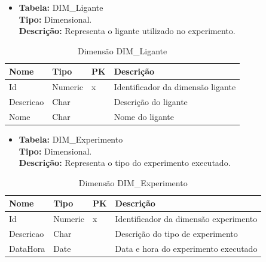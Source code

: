 \begin{itemize}
	\item
		\textbf{Tabela:} DIM\_Ligante \\
		\textbf{Tipo:} Dimensional. \\
		\textbf{Descrição:} Representa o ligante utilizado no experimento. \\
\end{itemize}
\begin{table}[h]
	\caption{Dimensão DIM\_Ligante}
	\centering
	\begin{tabular}{@{}llll@{}}
	\toprule
	\textbf{Nome} & \textbf{Tipo} & \textbf{PK} & \textbf{Descrição}           		   \\ \midrule
	Id            & Numeric           & x           & Identificador da dimensão ligante    \\
	Descricao     & Char      &             & Descrição do ligante           	   \\
	Nome 		  & Char       &             & Nome do ligante 					   \\ \bottomrule
	\end{tabular}
\end{table}


\begin{itemize}
	\item
		\textbf{Tabela:} DIM\_Experimento \\
		\textbf{Tipo:} Dimensional. \\
		\textbf{Descrição:} Representa o tipo do experimento executado. \\
\end{itemize}

\begin{table}[h]
	\caption{Dimensão DIM\_Experimento}
	\centering
	\begin{tabular}{@{}llll@{}}
	\toprule
	\textbf{Nome} 	& \textbf{Tipo} & \textbf{PK} & \textbf{Descrição}           			\\ \midrule
	Id            	& Numeric           & x           & Identificador da dimensão experimento   \\
	Descricao     	& Char       &             & Descrição do tipo de experimento        \\
	DataHora 		& Date 		    &             & Data e hora do experimento executado 	\\ \bottomrule
	\end{tabular}
\end{table}

